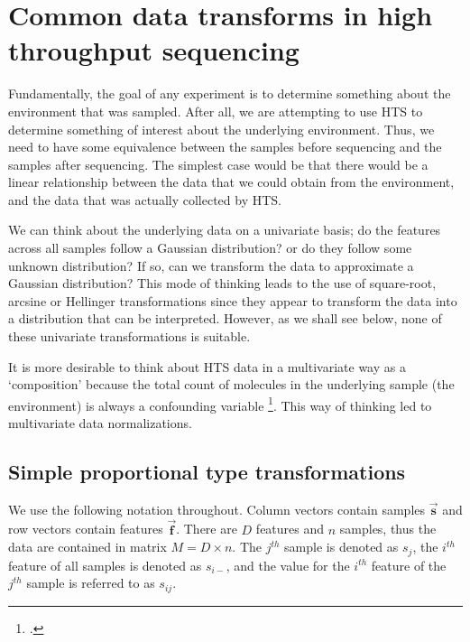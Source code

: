  

\chapter[Transforms and distances]{Common data transforms in high throughput sequencing}

Fundamentally, the goal of any experiment is to determine something about the environment that was sampled. After all, we are attempting to use HTS to determine something of interest about the underlying environment. Thus, we need to have some equivalence between the samples before sequencing and the samples after sequencing. The simplest case would be that there would be a linear relationship between the data that we could obtain from the environment, and the data that was actually collected by HTS. 

We can think about the underlying data on a univariate basis; do the features across all samples follow a Gaussian distribution? or do they follow some unknown distribution? If so, can we transform the data to approximate a Gaussian distribution? This mode of thinking leads to the use of square-root, arcsine or Hellinger transformations since they appear to transform the data into a distribution that can be interpreted. However, as we shall see below, none of these univariate transformations  is suitable. 

It is more desirable to think about HTS data in a multivariate way as a `composition'  because the total count of molecules in the underlying sample (the environment) is always a confounding variable \footcite{Loven:2012aa}. This way of thinking led to multivariate data normalizations. 

\section{Simple proportional type transformations}

We use the following notation throughout. Column vectors contain samples $\vec{\textbf{s}}$ and row vectors contain features $\vec{\textbf{f}}$.  There are $D$ features and $n$ samples, thus the data are contained in matrix $M = D \times n$. The $j^{th}$ sample is denoted as $s_{j}$, the $i^{th}$ feature of all samples is denoted as $s_{i-}$, and the value for the $i^{th}$ feature of the $j^{th}$ sample is referred to as $s_{ij}$.

